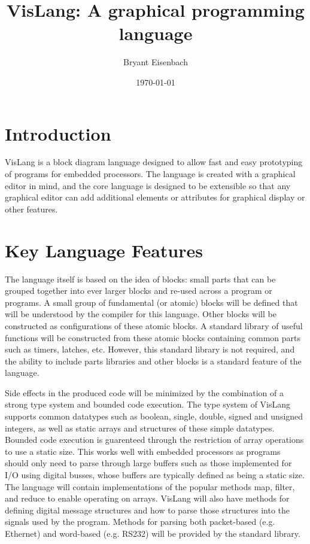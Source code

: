 \documentclass[dvips,12pt]{article}
\begin{document}
\title{VisLang: A graphical programming language}
\author{Bryant Eisenbach}
\date{\today}
\maketitle

\section{Introduction}

VisLang is a block diagram language designed to allow fast and
easy prototyping of programs for embedded processors. The language is created
with a graphical editor in mind, and the core language is designed to be extensible
so that any graphical editor can add additional elements or attributes for graphical
display or other features.

\section{Key Language Features}

The language itself is based on the idea of blocks: small parts that can be grouped
together into ever larger blocks and re-used across a program or programs. A small
group of fundamental (or atomic) blocks will be defined that will be understood by the
compiler for this language. Other blocks will be constructed as configurations of
these atomic blocks. A standard library of useful functions will be constructed
from these atomic blocks containing common parts such as timers, latches, etc. However,
this standard library is not required, and the ability to include parts libraries and
other blocks is a standard feature of the language.

Side effects in the produced code will be minimized by the combination of a strong
type system and bounded code execution. The type system of VisLang supports common
datatypes such as boolean, single, double, signed and unsigned integers, as well as
static arrays and structures of these simple datatypes. Bounded code execution is
guarenteed through the restriction of array operations to use a static size. This
works well with embedded processors as programs should only need to parse through
large buffers such as those implemented for I/O using digital busses, whose buffers
are typically defined as being a static size. The language will contain
implementations of the popular methods map, filter, and reduce to enable operating
on arrays. VisLang will also have methods for defining digital message structures
and how to parse those structures into the signals used by the program. Methods
for parsing both packet-based (e.g. Ethernet) and word-based (e.g. RS232)
will be provided by the standard library.
\end{document}
